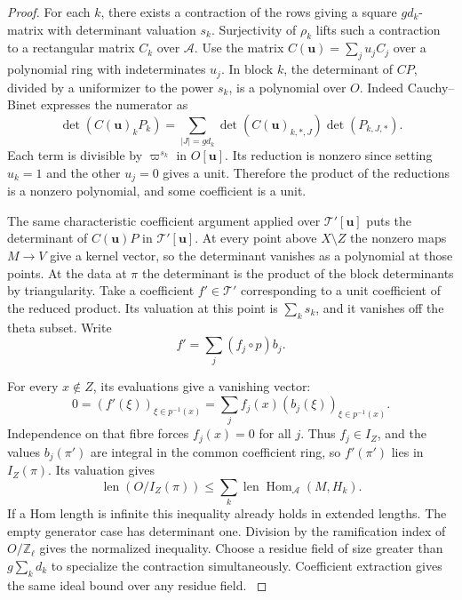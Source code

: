 \begin{proof}
For each \(k\), there exists a contraction of the rows
giving a square \(gd_k\)-matrix with determinant
valuation \(s_k\). Surjectivity of \(\rho_k\) lifts
such a contraction to a rectangular matrix \(C_k\)
over \(\mathcal A\). Use the matrix
\(C(\mathbf u)=\sum_j u_j C_j\) over a polynomial
ring with indeterminates \(u_j\).
In block \(k\), the determinant of \(CP\), divided
by a uniformizer to the power \(s_k\), is a polynomial
over \(O\). Indeed Cauchy--Binet expresses the numerator as
\[
 \det(C(\mathbf u)_kP_k)=
   \sum_{|J|=gd_k}\det(C(\mathbf u)_{k,*,J})\det(P_{k,J,*}).
\]
Each term is divisible by \(\varpi^{s_k}\) in \(O[\mathbf u]\).
Its reduction is nonzero since setting \(u_k=1\)
and the other \(u_j=0\) gives a unit. Therefore the
product of the reductions is a nonzero polynomial,
and some coefficient is a unit.

The same characteristic coefficient argument applied
over \(\mathcal T'[\mathbf u]\) puts the determinant of
\(C(\mathbf u)P\) in \(\mathcal T'[\mathbf u]\). At every
point above \(X\setminus Z\) the nonzero maps \(M\to V\)
give a kernel vector, so the determinant vanishes
as a polynomial at those points. At the data at
\(\pi\) the determinant is the product of the block
determinants by triangularity. Take a coefficient
\(f'\in\mathcal T'\) corresponding to a unit coefficient
of the reduced product. Its valuation at this point
is \(\sum_k s_k\), and it vanishes off the theta subset.
Write
\[
 f'=\sum_j(f_j\circ p)b_j.
\]

For every
\(x\notin Z\), its evaluations give a vanishing vector:
\[
 0=(f'(\xi))_{\xi\in p^{-1}(x)}
   =\sum_j f_j(x)(b_j(\xi))_{\xi\in p^{-1}(x)} .
\]
Independence on that fibre forces \(f_j(x)=0\) for
all \(j\). Thus \(f_j\in I_Z\), and the values \(b_j(\pi')\)
are integral in the common coefficient ring, so \(f'(\pi')\)
lies in \(I_Z(\pi)\). Its valuation gives
\[
 \operatorname{len}(O/I_Z(\pi))
 \le \sum_k\operatorname{len}\operatorname{Hom}_{\mathcal A}(M,H_k).
\]
If a Hom length is infinite this inequality already
holds in extended lengths. The empty generator case
has determinant one. Division by the ramification
index of \(O/\mathbb Z_\ell\) gives the normalized
inequality.  Choose a residue field
of size greater than \(g\sum_k d_k\) to specialize the
contraction simultaneously. Coefficient extraction gives
the same ideal bound over any residue field. \label{cor:congruence-determinant-2}

\end{proof}

